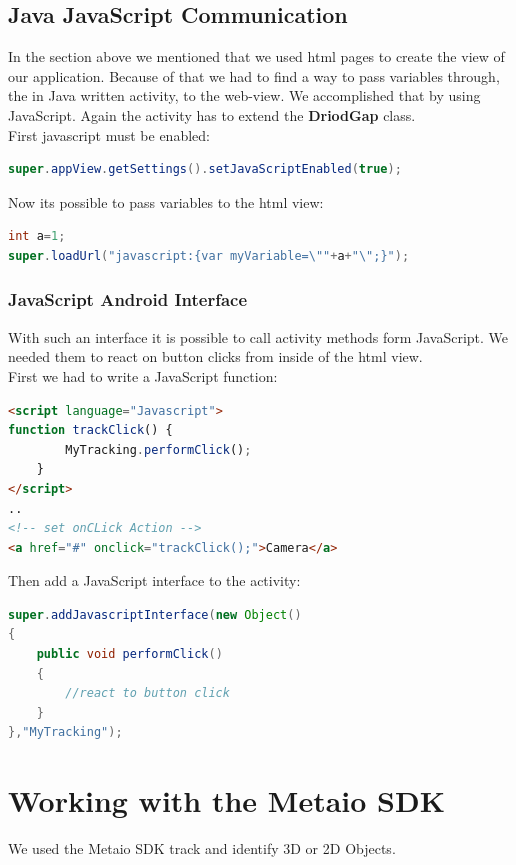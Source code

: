 \subsection{Java JavaScript Communication}
In the section above we mentioned that we used html pages to create the view of our application. Because of that we had to find a way to pass variables through, the in Java written activity, to the web-view. We accomplished that by using JavaScript. Again the activity has to extend the \textbf{DriodGap} class.
\\



First javascript must be enabled:
\begin{lstlisting}[language=java]
super.appView.getSettings().setJavaScriptEnabled(true);
\end{lstlisting}

Now its possible to pass variables to the html view:
\begin{lstlisting}[language=java]
int a=1;
super.loadUrl("javascript:{var myVariable=\""+a+"\";}");
\end{lstlisting}


\subsubsection{JavaScript Android Interface}
With such an interface it is possible to call activity methods form JavaScript. We needed them to react on button clicks from inside of the html view.  
\\

First we had to write a JavaScript function:
\begin{lstlisting}[language=html]
<script language="Javascript">
function trackClick() {
        MyTracking.performClick();
    }
</script>
..
<!-- set onCLick Action -->
<a href="#" onclick="trackClick();">Camera</a>
\end{lstlisting}





Then add a JavaScript interface to the activity:
\begin{lstlisting}[language=java]
super.addJavascriptInterface(new Object()
{
	public void performClick()
	{
		//react to button click
	}
},"MyTracking");
\end{lstlisting}

\section{Working with the Metaio SDK}
We used the Metaio SDK track and identify 3D or 2D Objects.


